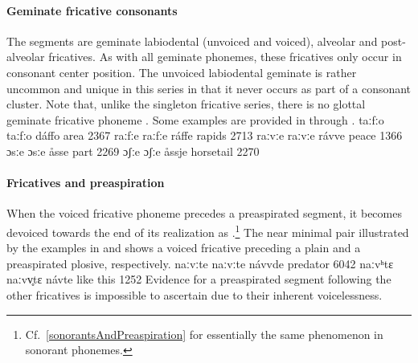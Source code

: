 \paragraph{Geminate fricative consonants}
The segments \mbox{} are geminate labiodental (unvoiced and voiced), alveolar and post-alveolar fricatives. As with all geminate phonemes, these fricatives only occur in consonant center position. The unvoiced labiodental geminate  is rather uncommon and unique in this series in that it never occurs as part of a consonant cluster. Note that, unlike the singleton fricative series, there is no glottal geminate fricative phoneme . Some examples are provided in  through .
	{taː{fː}o}	{taː{fː}o}	{dáffo}	{area\BS{}}		{2367}%
	{raː{fː}e}	{raː{fː}e}	{ráffe}	{rapids\BS{}}		{2713}%
	{raː{vː}e}	{raː{vː}e}	{rávve}	{peace\BS{}}		{1366}%
	{ɔ{sː}e}	{ɔ{sː}e}	{åsse}	{part\BS{}}	{2269}
	{ɔ{ʃː}e}	{ɔ{ʃː}e}	{åssje}	{horsetail\BS{}}	{2270}


\paragraph{Fricatives and preaspiration}\label{fricativesAndPreaspiration}
When the voiced fricative phoneme  precedes a preaspirated segment, it becomes devoiced towards the end of its realization as \ipa{[vv̥]}.\footnote{Cf.~\SEC\ref{sonorantsAndPreaspiration} for essentially the same phenomenon in sonorant phonemes.} 
The near minimal pair illustrated by the examples in  and  shows a voiced fricative preceding a plain and a preaspirated plosive, respectively.
	{naː{vːt}e}	{naː{vːt}e}	{návvde}	{predator\BS{}}		{6042}%
		{naː{vʰt}ɛ}	{naː{vv̥t}ɛ}	{návte}	{like this}		{1252}%
Evidence for a preaspirated segment following the other fricatives is impossible to ascertain due to their inherent voicelessness.


